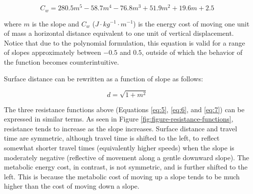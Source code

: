 \documentclass[]{elsarticle} %
\begin{document}
\begin{equation} \label{eq:6}C_w = 280.5m^5 - 58.7m^4 - 76.8m^3 + 51.9m^2 + 19.6m + 2.5\end{equation}

\noindent where \(m\) is the slope and \(C_w\)
(\(J\cdot kg^{-1}\cdot m^{-1}\)) is the energy cost of moving one unit
of mass a horizontal distance equivalent to one unit of vertical
displacement. Notice that due to the polynomial formulation, this
equation is valid for a range of slopes approximately between \(-0.5\)
and \(0.5\), outside of which the behavior of the function becomes
counterintuitive.

Surface distance can be rewritten as a function of slope as follows:

\begin{equation} \label{eq:7}d = \sqrt{1 + m^2}\end{equation}

The three resistance functions above (Equations \ref{eq:5}, \ref{eq:6},
and \ref{eq:7}) can be expressed in similar terms. As seen in Figure
\ref{fig:figure-resistance-functions}, resistance tends to increase as
the slope increases. Surface distance and travel time are symmetric,
although travel time is shifted to the left, to reflect somewhat shorter
travel times (equivalently higher speeds) when the slope is moderately
negative (reflective of movement along a gentle downward slope). The
metabolic energy cost, in contrast, is not symmetric, and is further
shifted to the left. This is because the metabolic cost of moving up a
slope tends to be much higher than the cost of moving down a slope.
\end{document}
